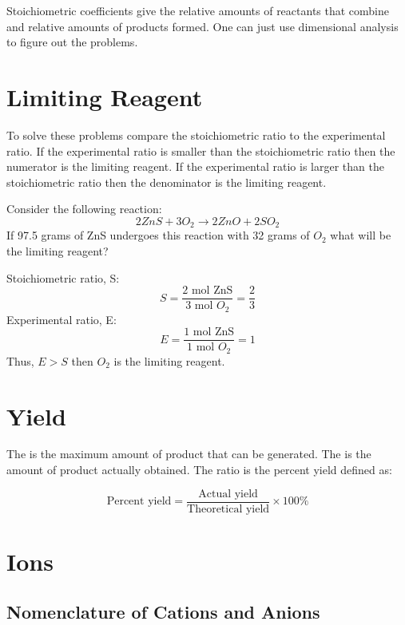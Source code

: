 \documentclass[../GChemReview.tex]{subfiles}
\begin{document}
Stoichiometric coefficients give the relative amounts of reactants that combine
and relative amounts of products formed. One can just use dimensional analysis
to figure out the problems.

\section{Limiting Reagent}

To solve these problems compare the stoichiometric ratio to the experimental
ratio. If the experimental ratio is smaller than the stoichiometric ratio then
the numerator is the limiting reagent. If the experimental ratio is larger than
the stoichiometric ratio then the denominator is the limiting reagent.\\
\begin{problem*}
  Consider the following reaction:
  \[ 2 ZnS + 3O_{2} \rightarrow 2 ZnO + 2 SO_{2} \]
  If 97.5 grams of ZnS undergoes this reaction with 32 grams of $ O_{2} $ what
  will be the limiting reagent?
\end{problem*}

\begin{solution}
  Stoichiometric ratio, S:
  \[ S = \dfrac{2 \text{ mol ZnS}}{3 \text{ mol }  O_{2}} = \dfrac{2}{3}\]
  Experimental ratio, E:
  \[ E = \dfrac{1 \text{ mol ZnS}}{1 \text{ mol } O_{2}} = 1\]
  Thus, $ E > S $ then $ O_{2} $ is the limiting reagent.
\end{solution}

\section{Yield\supdag}

The  is the maximum amount of product that can be
generated. The  is the amount of product actually obtained.
The ratio is the percent yield defined as:

\begin{equation}
  \text{Percent yield} = \dfrac{\text{Actual yield}}{\text{Theoretical
  yield}}\times 100\%
\end{equation}

\section{Ions\supdag}

\subsection{Nomenclature of Cations and Anions\supdag}
\end{document}
